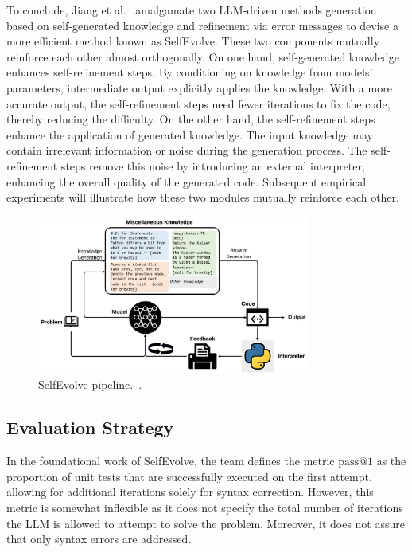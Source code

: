\documentclass[a4paper,oneside]{book}
\begin{document}
To conclude, Jiang et al.~\cite{jiang2023selfevolve} amalgamate two LLM-driven methods \- generation based on self-generated knowledge and refinement via error messages \- to devise a more efficient method known as SelfEvolve. These two components mutually reinforce each other almost orthogonally. On one hand, self-generated knowledge enhances self-refinement steps. By conditioning on knowledge from models' parameters, intermediate output explicitly applies the knowledge. With a more accurate output, the self-refinement steps need fewer iterations to fix the code, thereby reducing the difficulty. On the other hand, the self-refinement steps enhance the application of generated knowledge. The input knowledge may contain irrelevant information or noise during the generation process. The self-refinement steps remove this noise by introducing an external interpreter, enhancing the overall quality of the generated code. Subsequent empirical experiments will illustrate how these two modules mutually reinforce each other.

\begin{figure}[!htb]
    \centering
    \includegraphics[width=0.8\textwidth]{img/selfevolve}
    \caption{SelfEvolve pipeline.~\cite{jiang2023selfevolve}.}\label{fig:selfevolve}
\end{figure}

\subsection{Evaluation Strategy}
In the foundational work of SelfEvolve, the team defines the metric $\text{pass@1}$ as the proportion of unit tests that are successfully executed on the first attempt, allowing for additional iterations solely for syntax correction. However, this metric is somewhat inflexible as it does not specify the total number of iterations the LLM is allowed to attempt to solve the problem. Moreover, it does not assure that only syntax errors are addressed.
\end{document}
